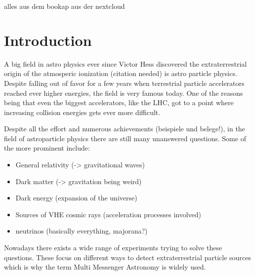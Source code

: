 alles aus dem bookap aus der nextcloud

\chapter{Introduction}

A big field in astro physics ever since Victor Hess discovered
the extraterrestrial origin of the atmosperic ionization (citation needed)
is astro particle physics. Despite falling out of favor for a few years
when terrestrial particle accelerators reached ever higher energies,
the field is very famous today. One of the reasons being that
even the biggest accelerators, like the LHC, got to a point where
increasing collision energies gets ever more difficult.

Despite all the effort and numerous achievements (beispiele und belege!),
in the field of astroparticle physics
there are still many unanswered questions.
Some of the more prominent include:
\begin{itemize}
    \item{General relativity (-> gravitational waves)}
    \item{Dark matter (-> gravitation being weird)}
    \item{Dark energy (expansion of the universe)}
    \item{Sources of VHE cosmic rays (acceleration processes involved)}
    \item{neutrinos (basically everything, majorana?)}
\end{itemize}

Nowadays there exists a wide range of experiments trying to
solve these questions. These focus on different ways to detect
extraterrestrial particle sources which is why
the term Multi Messenger Astronomy is widely used.


